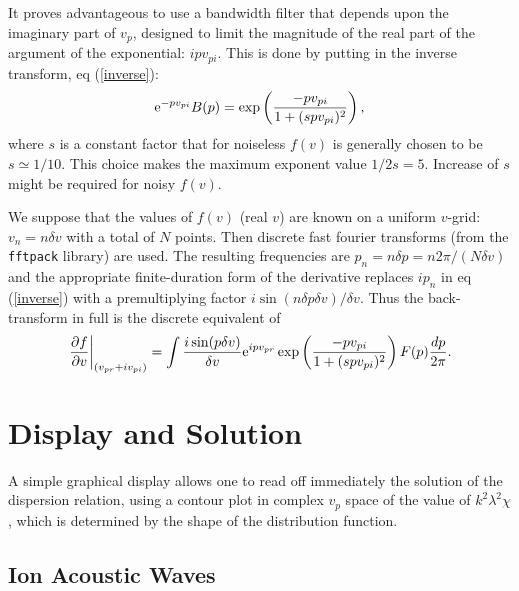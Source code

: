 \documentclass[12pt]{article}
\begin{document}
It proves advantageous to use a bandwidth filter that depends upon the
imaginary part of $v_p$, designed to limit the magnitude of the real
part of the argument of the exponential: $ipv_{pi}$. This is done by
putting in the inverse transform, eq (\ref{inverse}): 
\begin{equation}
  {\rm e}^{-pv_{pi}} B(p) =  \exp\left({-p v_{pi}\over{1+(s p v_{pi})^2}}\right),
\end{equation}
where $s$ is a constant factor that for noiseless $f(v)$ is generally
chosen to be $s\simeq 1/10$. This choice makes the maximum exponent value
$1/2s=5$.  Increase of $s$ might be required for noisy $f(v)$.

We suppose that the values of $f(v)$ (real $v$) are known on a uniform
$v$-grid: $v_n = n \delta v$ with a total of $N$ points. Then discrete
fast fourier transforms (from the \texttt{fftpack} library) are
used. The resulting frequencies are
$p_n= n \delta p = n 2\pi/(N \delta v)$ and the appropriate
finite-duration form of the derivative replaces $ip_n$ in eq
(\ref{inverse}) with a premultiplying factor
$i\sin(n \delta p \delta v)/\delta v$.
Thus the back-transform in full is the discrete equivalent of
\begin{equation}
  \label{eq:backtrans}
    \left.\partial f\over\partial v\right|_{(v_{pr}+iv_{pi})}
    =\int {i\sin(p\delta v)\over\delta v}  
    {\rm e}^{ipv_{pr}} \exp\left(-p v_{pi}\over 1+(spv_{pi})^2\right) 
    F(p) {dp\over 2\pi}.
\end{equation}


\section{Display and Solution}

A simple graphical display allows one to read off immediately the
solution of the dispersion relation, using a contour plot in complex
$v_p$ space of the value of $k^2\lambda^2\chi$, which is determined by
the shape of the distribution function.

\subsection{Ion Acoustic Waves}
\end{document}

